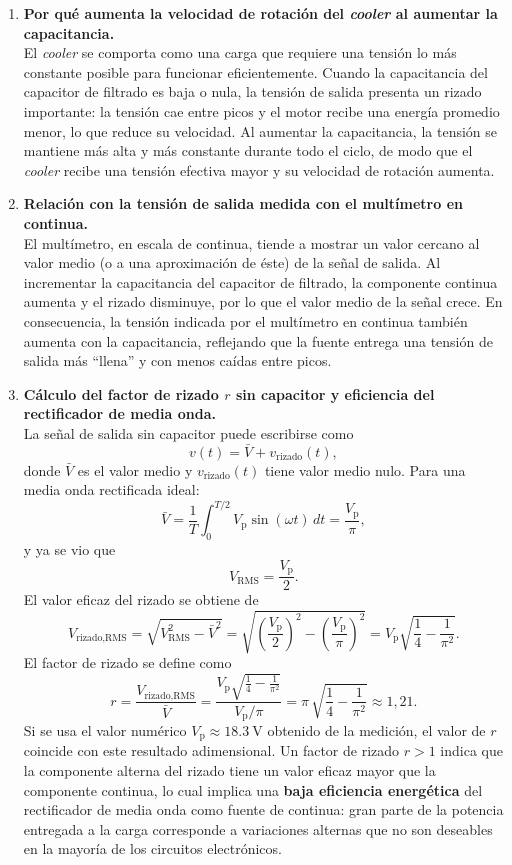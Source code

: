 \documentclass[a4paper,12pt]{article}
\begin{document}
\begin{enumerate}
    \item \textbf{Por qué aumenta la velocidad de rotación del \emph{cooler} al aumentar la capacitancia.}\\[4pt]
    El \emph{cooler} se comporta como una carga que requiere una tensión lo más constante posible para funcionar eficientemente. Cuando la capacitancia del capacitor de filtrado es baja o nula, la tensión de salida presenta un rizado importante: la tensión cae entre picos y el motor recibe una energía promedio menor, lo que reduce su velocidad. Al aumentar la capacitancia, la tensión se mantiene más alta y más constante durante todo el ciclo, de modo que el \emph{cooler} recibe una tensión efectiva mayor y su velocidad de rotación aumenta.

    \item \textbf{Relación con la tensión de salida medida con el multímetro en continua.}\\[4pt]
    El multímetro, en escala de continua, tiende a mostrar un valor cercano al valor medio (o a una aproximación de éste) de la señal de salida. Al incrementar la capacitancia del capacitor de filtrado, la componente continua aumenta y el rizado disminuye, por lo que el valor medio de la señal crece. En consecuencia, la tensión indicada por el multímetro en continua también aumenta con la capacitancia, reflejando que la fuente entrega una tensión de salida más “llena” y con menos caídas entre picos.

    \item \textbf{Cálculo del factor de rizado \(r\) sin capacitor y eficiencia del rectificador de media onda.}\\[4pt]
    La señal de salida sin capacitor puede escribirse como
    \[
        v(t) = \bar{V} + v_{\text{rizado}}(t),
    \]
    donde \(\bar{V}\) es el valor medio y \(v_{\text{rizado}}(t)\) tiene valor medio nulo. Para una media onda rectificada ideal:
    \[
        \bar{V} = \frac{1}{T}\int_0^{T/2} V_{\text{p}} \sin(\omega t)\, dt = \frac{V_{\text{p}}}{\pi},
    \]
    y ya se vio que
    \[
        V_{\text{RMS}} = \frac{V_{\text{p}}}{2}.
    \]
    El valor eficaz del rizado se obtiene de
    \[
        V_{\text{rizado,RMS}} = \sqrt{V_{\text{RMS}}^{2} - \bar{V}^{2}}
        = \sqrt{\left(\frac{V_{\text{p}}}{2}\right)^{2} - \left(\frac{V_{\text{p}}}{\pi}\right)^{2}}
        = V_{\text{p}} \sqrt{\frac{1}{4} - \frac{1}{\pi^{2}}}.
    \]
    El factor de rizado se define como
    \[
        r = \frac{V_{\text{rizado,RMS}}}{\bar{V}}
          = \frac{V_{\text{p}} \sqrt{\tfrac{1}{4} - \tfrac{1}{\pi^{2}}}}{V_{\text{p}}/\pi}
          = \pi\,\sqrt{\frac{1}{4} - \frac{1}{\pi^{2}}} \approx 1{,}21.
    \]
    Si se usa el valor numérico \(V_{\text{p}} \approx \SI{18,3}{\volt}\) obtenido de la medición, el valor de \(r\) coincide con este resultado adimensional. Un factor de rizado \(r > 1\) indica que la componente alterna del rizado tiene un valor eficaz mayor que la componente continua, lo cual implica una \textbf{baja eficiencia energética} del rectificador de media onda como fuente de continua: gran parte de la potencia entregada a la carga corresponde a variaciones alternas que no son deseables en la mayoría de los circuitos electrónicos.
\end{enumerate}
\end{document}
